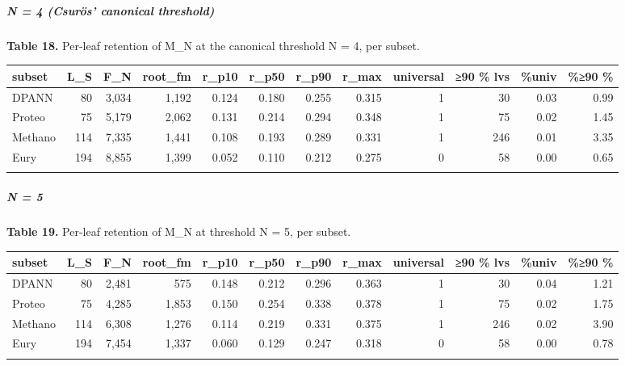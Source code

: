 \documentclass[
  10pt,
]{article}
\begin{document}
\subparagraph{N = 4 (Csurös' canonical
threshold)}\label{n--4-csuruxf6s-canonical-threshold}

\textbf{Table 18.} Per-leaf retention of M\_N at the canonical threshold
N = 4, per subset.

\begin{center}
\begin{adjustbox}{max width=\textwidth}
\begin{tabular}{@{}lrrrrrrrrrrr@{}}
\toprule\noalign{}
subset & L\_S & F\_N & root\_fm & r\_p10 & r\_p50 & r\_p90 & r\_max &
universal & ≥90 \% lvs & \%univ & \%≥90 \% \\
\midrule\noalign{}
DPANN & 80 & 3,034 & 1,192 & 0.124 & 0.180 & 0.255 & 0.315 & 1 & 30 &
0.03 & 0.99 \\
Proteo & 75 & 5,179 & 2,062 & 0.131 & 0.214 & 0.294 & 0.348 & 1 & 75 &
0.02 & 1.45 \\
Methano & 114 & 7,335 & 1,441 & 0.108 & 0.193 & 0.289 & 0.331 & 1 & 246
& 0.01 & 3.35 \\
Eury & 194 & 8,855 & 1,399 & 0.052 & 0.110 & 0.212 & 0.275 & 0 & 58 &
0.00 & 0.65 \\
\bottomrule\noalign{}
\end{tabular}
\end{adjustbox}
\end{center}

\subparagraph{N = 5}\label{n--5}

\textbf{Table 19.} Per-leaf retention of M\_N at threshold N = 5, per
subset.

\begin{center}
\begin{adjustbox}{max width=\textwidth}
\begin{tabular}{@{}lrrrrrrrrrrr@{}}
\toprule\noalign{}
subset & L\_S & F\_N & root\_fm & r\_p10 & r\_p50 & r\_p90 & r\_max &
universal & ≥90 \% lvs & \%univ & \%≥90 \% \\
\midrule\noalign{}
DPANN & 80 & 2,481 & 575 & 0.148 & 0.212 & 0.296 & 0.363 & 1 & 30 & 0.04
& 1.21 \\
Proteo & 75 & 4,285 & 1,853 & 0.150 & 0.254 & 0.338 & 0.378 & 1 & 75 &
0.02 & 1.75 \\
Methano & 114 & 6,308 & 1,276 & 0.114 & 0.219 & 0.331 & 0.375 & 1 & 246
& 0.02 & 3.90 \\
Eury & 194 & 7,454 & 1,337 & 0.060 & 0.129 & 0.247 & 0.318 & 0 & 58 &
0.00 & 0.78 \\
\bottomrule\noalign{}
\end{tabular}
\end{adjustbox}
\end{center}
\end{document}
